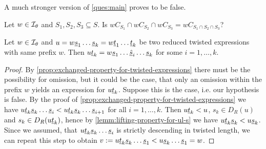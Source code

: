 A much stronger version of \ref{ques:main} proves to be false.

\begin{ques}
	Let $w \in \mathcal{I}_{\theta}$ and $S_1,S_2,S_3 \subseteq S$. Is $wC_{S_1} \cap wC_{S_2} \cap wC_{S_3} = wC_{S_1 \cap S_2 \cap S_3}$?
	\todo
\end{ques}

\begin{lemm}
	Let $w \in \mathcal{I}_{\theta}$ and $u = w \underline{s}_1 \ldots \underline{s}_k = w \underline{t}_1 \ldots \underline{t}_k$ be two reduced twisted expressions with same prefix $w$. Then $u \underline{t}_k = w \underline{s}_1 \ldots \underline{\hat s}_i \ldots \underline{s}_k$ for some $i = 1,\ldots,k$.

	\begin{proof}
		By \ref{prop:exchanged-property-for-twisted-expressions} there must be the possibility for omission, but it could be the case, that only an omission within the prefix $w$ yields an expression for $u \underline{t}_k$. Suppose this is the case, i.e. our hypothesis is false. By the proof of \ref{prop:exchanged-property-for-twisted-expressions} we have $u \underline{t}_k \underline{s}_k \ldots \underline{s}_i < u \underline{t}_k \underline{s}_k \ldots \underline{s}_{i+1}$ for all $i = 1,\ldots,k$. Then $u \underline{t}_k < u$, $s_k \in D_R(u)$ and $s_k \in D_R(u \underline{t}_k)$, hence by \ref{lemm:lifting-property-for-ul-s} we have $u \underline{t}_k \underline{s}_k < u \underline{s}_k$. Since we assumed, that $u \underline{t}_k \underline{s}_k \ldots \underline{s}_i$ is strictly descending in twisted length, we can repeat this step to obtain $v := u \underline{t}_k \underline{s}_k \ldots \underline{s}_1 < u \underline{s}_k \ldots \underline{s}_1 = w$. \todo
	\end{proof}
\end{lemm}


